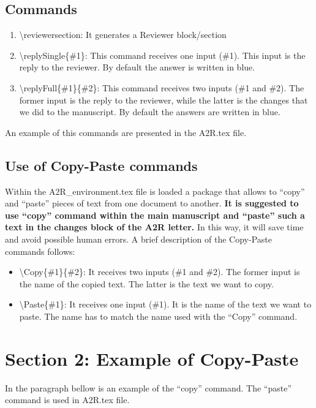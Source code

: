 \documentclass[./IEEE_Journal.tex]{subfiles}
\begin{document}
\subsection{Commands}
\begin{enumerate}
    \item \textbackslash reviewersection: It generates a Reviewer block/section
    \item \textbackslash replySingle\{\#1\}: This command receives one input (\#1). This input is the reply to the reviewer. By default the answer is written in blue. 
    \item \textbackslash replyFull\{\#1\}\{\#2\}: This command receives two inputs (\#1 and \#2). The former input is the reply to the reviewer, while the latter is the changes that we did to the manuscript. By default the answers are written in blue.
\end{enumerate}
An example of this commands are presented in the A2R.tex file.




\subsection{Use of Copy-Paste commands}
Within the A2R\_environment.tex file is loaded a package that allows to ``copy'' and ``paste'' pieces of text from one document to another.
\textbf{It is suggested to use ``copy'' command within the main manuscript and ``paste'' such a text in the changes block of the A2R letter.}
In this way, it will save time and avoid possible human errors.
A brief description of the Copy-Paste commands follows:
\begin{itemize}
    \item \textbackslash Copy\{\#1\}\{\#2\}: It receives two inputs (\#1 and \#2). The former input is the name of the copied text. The latter is the text we want to copy.
    \item \textbackslash Paste\{\#1\}: It receives one input (\#1). It is the name of the text we want to paste. The name has to match the name used with the ``Copy'' command.
\end{itemize}

\section{Section 2: Example of Copy-Paste}\label{sec:Sec2}
In the paragraph bellow is an example of the ``copy'' command. The ``paste'' command is used in A2R.tex file.
\end{document}
